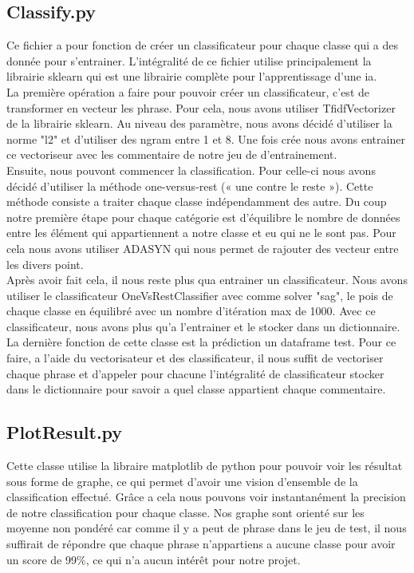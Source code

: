 \documentclass[12pt ,a4paper ]{article}
\begin{document}
\begin{multicols}{2}
\subsection{Classify.py}
Ce fichier a pour fonction de créer un classificateur pour chaque classe qui a des donnée pour s'entrainer. L'intégralité de ce fichier utilise principalement la librairie sklearn qui est une librairie complète pour l'apprentissage d'une ia.\\

\noindent La première opération a faire pour pouvoir créer un classificateur, c'est de transformer en vecteur les phrase. Pour cela, nous avons utiliser TfidfVectorizer de la librairie sklearn. Au niveau des paramètre, nous avons décidé d'utiliser la norme "l2" et d'utiliser des ngram entre 1 et 8. Une fois crée nous avons entrainer ce vectoriseur avec les commentaire de notre jeu de d'entrainement.\\

Ensuite, nous pouvont commencer la classification. Pour celle-ci nous avons décidé d'utiliser la méthode one-versus-rest (« une contre le reste »). Cette méthode consiste a  traiter chaque classe indépendamment des autre. Du coup notre première étape pour chaque catégorie est d'équilibre le nombre de données entre les élément qui appartiennent a notre classe et eu qui ne le sont pas. Pour cela nous avons utiliser ADASYN qui nous permet de rajouter des vecteur entre les divers point.\\

Après avoir fait cela, il nous reste plus qua entrainer un classificateur. Nous avons utiliser le classificateur OneVsRestClassifier avec comme solver "sag", le pois de chaque classe en équilibré avec un nombre d'itération max de 1000. Avec ce classificateur, nous avons plus qu'a l'entrainer et le stocker dans un dictionnaire.\\

La dernière fonction de cette classe est la prédiction un dataframe test. Pour ce faire, a l'aide du vectorisateur et des classificateur, il nous suffit de vectoriser chaque phrase et d'appeler pour chacune l'intégralité de classificateur stocker dans le dictionnaire pour savoir a quel classe appartient chaque commentaire.

\subsection{PlotResult.py}
Cette classe utilise la libraire matplotlib de python pour pouvoir voir les résultat sous forme de graphe, ce qui permet d'avoir une vision d'ensemble de la classification effectué. Grâce a cela nous pouvons voir instantanément la precision de notre classification pour chaque classe.
Nos graphe sont orienté sur les moyenne non pondéré car comme il y a peut de phrase dans le jeu de test, il nous suffirait de répondre que chaque phrase n'appartiens a aucune classe pour avoir un score de 99\%, ce qui n'a aucun intérêt pour notre projet.

\end{multicols}
\end{document}

